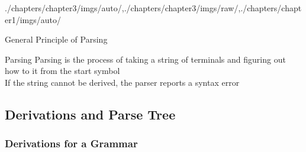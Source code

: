 \begin{graphicspathcontext}{{./chapters/chapter3/imgs/auto/},{./chapters/chapter3/imgs/raw/},{./chapters/chapter1/imgs/auto/}}
\begin{bibunit}[apalike]
\begin{frame}{{General Principle} of Parsing}
	\begin{definitionblock}{Parsing}
		Parsing is the process of taking a string of terminals and figuring out how to  it from the start symbol \\
		If the string cannot be derived, the parser reports a syntax error
	\end{definitionblock}
	\vspace{.5cm}
	\begin{rightarrowsequence}
	\end{rightarrowsequence}
\end{frame}

\subsection{Derivations and Parse Tree}
\subsubsectiontableofcontentslide*

\subsubsection{Derivations for a Grammar}


\end{bibunit}
\end{graphicspathcontext}
